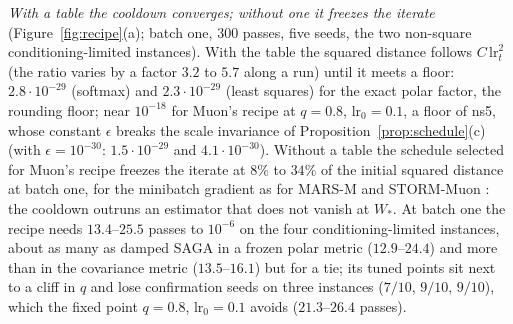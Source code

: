 \documentclass[10pt]{article}
\theoremstyle{remark}
\begin{document}
\begin{description}[leftmargin=2.3em,labelwidth=2.0em,labelsep=0.3em,itemsep=1pt,topsep=3pt,parsep=0pt,font=\normalfont\bfseries]
\item[(M5)] \emph{With a table the cooldown converges; without one it freezes the iterate} (Figure~\ref{fig:recipe}(a);
batch one, $300$ passes, five seeds, the two non-square conditioning-limited instances). With the table the squared
distance follows $C\,\mathrm{lr}_t^2$ (the ratio varies by a factor $3.2$ to $5.7$ along a run) until it meets a floor:
$2.8\cdot10^{-29}$ (softmax) and $2.3\cdot10^{-29}$ (least squares) for the exact polar factor, the rounding floor; near
$10^{-18}$ for Muon's recipe at $q=0.8$, $\mathrm{lr}_0=0.1$, a floor of ns5, whose constant $\epsilon$ breaks the scale
invariance of Proposition~\ref{prop:schedule}(c) (with $\epsilon=10^{-30}$: $1.5\cdot10^{-29}$ and $4.1\cdot10^{-30}$).
Without a table the schedule selected for Muon's recipe freezes the iterate at $8\%$ to $34\%$ of the initial squared distance at batch one, for the
minibatch gradient as for MARS-M \cite{liu2025marsm} and STORM-Muon \cite{cutkosky2019momentum}: the cooldown outruns an
estimator that does not vanish at $W_\ast$. At batch one the recipe needs $13.4$--$25.5$ passes to $10^{-6}$ on the four
conditioning-limited instances, about as many as damped SAGA in a frozen polar metric ($12.9$--$24.4$) and more than in the
covariance metric ($13.5$--$16.1$) but for a tie; its tuned points sit next to a cliff in $q$ and lose confirmation seeds
on three instances ($7/10$, $9/10$, $9/10$), which the fixed point $q=0.8$, $\mathrm{lr}_0=0.1$ avoids ($21.3$--$26.4$
passes).
\end{description}
\end{document}
